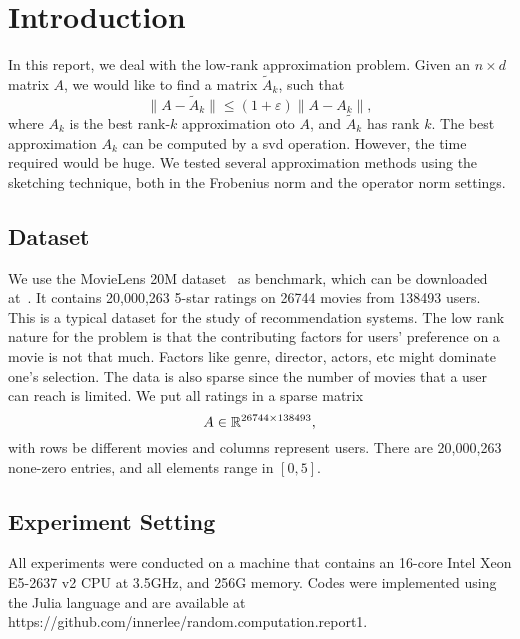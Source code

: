 \section{Introduction}
\label{sec:intro}

In this report, we deal with the low-rank approximation problem.
Given an $n\times d$ matrix $A$,
we would like to find a matrix $\tilde{A}_k$,
such that
\begin{equation}
    \| A - \tilde{A}_k \| \le (1+\varepsilon) \| A - A_k \|,
\end{equation}
where $A_k$ is the best rank-$k$ approximation oto $A$,
and $\tilde{A}_k$ has rank $k$.
The best approximation $A_k$ can be computed by a svd operation.
However, the time required would be huge.
We tested several approximation methods using the sketching technique,
both in the Frobenius norm and the operator norm settings.

\subsection{Dataset}

We use the MovieLens 20M dataset~\cite{lens} as benchmark,
which can be downloaded at~\cite{movielens}.
It contains 20,000,263 5-star ratings on 26744 movies from 138493 users.
This is a typical dataset for the study of recommendation systems.
The low rank nature for the problem is that the contributing factors
for users' preference on a movie is not that much.
Factors like genre, director, actors, etc might dominate one's selection.
The data is also sparse
since the number of movies that a user can reach is limited.
We put all ratings in a sparse matrix
\begin{equation}
    A \in {\mathbb{R}}^{26744\times 138493},
\end{equation}
with rows be different movies and columns represent users.
There are 20,000,263 none-zero entries,
and all elements range in $[0, 5]$.

\subsection{Experiment Setting}

All experiments were conducted on a machine that contains an 16-core
Intel Xeon E5-2637 v2 CPU at 3.5GHz, and 256G memory.
Codes were implemented using the Julia language and are available at
https://github.com/innerlee/random.computation.report1.
